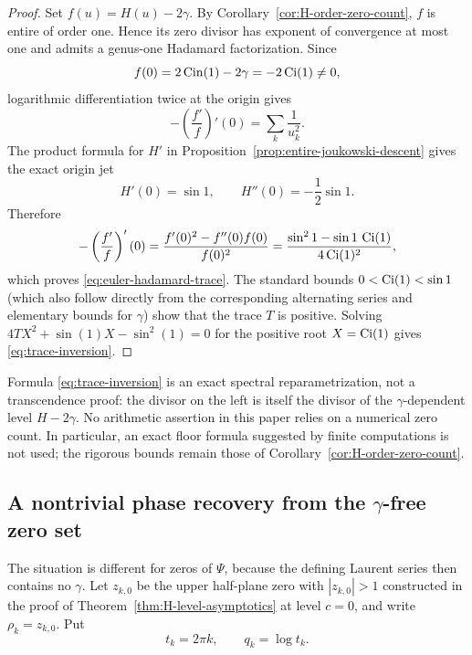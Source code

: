 \begin{proof}
Set $f(u)=H(u)-2\gamma$.  By
Corollary~\ref{cor:H-order-zero-count}, $f$ is entire of order one.  Hence
its zero divisor has exponent of convergence at most one and admits a
genus-one Hadamard factorization.  Since
\[
 f(0)=2\operatorname{Cin}(1)-2\gamma=-2\operatorname{Ci}(1)\ne0,
\]
logarithmic differentiation twice at the origin gives
\begin{equation}\label{eq:hadamard-log-derivative}
 -\left(\frac{f'}f\right)'(0)=\sum_k\frac1{u_k^2}.
\end{equation}
The product formula for $H'$ in
Proposition~\ref{prop:entire-joukowski-descent} gives the exact origin jet
\[
 H'(0)=\sin 1,
 \qquad
 H''(0)=-\frac12\sin 1.
\]
Therefore
\[
 -\left(\frac{f'}f\right)'(0)
 =\frac{f'(0)^2-f''(0)f(0)}{f(0)^2}
 =\frac{\sin^2 1-\sin 1\,\operatorname{Ci}(1)}{4\operatorname{Ci}(1)^2},
\]
which proves \eqref{eq:euler-hadamard-trace}.  The standard bounds
$0<\operatorname{Ci}(1)<\sin 1$ (which also follow directly from the corresponding
alternating series and elementary bounds for $\gamma$) show that the trace
$T$ is positive.  Solving
$4T X^2+\sin(1)X-\sin^2(1)=0$ for the positive root
$X=\operatorname{Ci}(1)$ gives \eqref{eq:trace-inversion}.
\end{proof}

\begin{remark}
Formula \eqref{eq:trace-inversion} is an exact spectral reparametrization,
not a transcendence proof: the divisor on the left is itself the divisor of
the $\gamma$-dependent level $H-2\gamma$.  No arithmetic assertion in this
paper relies on a numerical zero count.  In particular, an exact floor
formula suggested by finite computations is not used; the rigorous bounds
remain those of Corollary~\ref{cor:H-order-zero-count}.
\end{remark}

\subsection{A nontrivial phase recovery from the
\texorpdfstring{$\gamma$}{gamma}-free zero set}

The situation is different for zeros of $\Psi$, because the defining
Laurent series then contains no $\gamma$.  Let $z_{k,0}$ be the upper
half-plane zero with $|z_{k,0}|>1$ constructed in the proof of
Theorem~\ref{thm:H-level-asymptotics} at level $c=0$, and write
$\rho_k=z_{k,0}$.  Put
\[
 t_k=2\pi k,
 \qquad q_k=\log t_k.
\]

